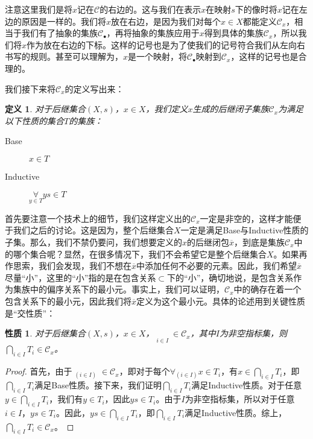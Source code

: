 \documentclass[oneside, 12pt]{ctexart}
\newtheorem{definition}{定义}[section]
\newtheorem{property}{性质}[section]
\begin{document}
注意这里我们是将$x$记在$\mathcal{C}$的右边的。这与我们在表示$x$在映射$s$下的像时将$x$记在左边的原因是一样的。我们将$x$放在右边，是因为我们对每个$x \in X$都能定义$\mathcal{C}_x$，相当于我们有了抽象的集族$\mathcal{C}_{\bullet}$，再将抽象的集族应用于$x$得到具体的集族$\mathcal{C}_x$，所以我们将$x$作为放在右边的下标。这样的记号也是为了使我们的记号符合我们从左向右书写的规则。甚至可以理解为，$x$是一个映射，将$\mathcal{C}_\bullet$映射到$\mathcal{C}_x$，这样的记号也是合理的。

我们接下来将$\mathcal{C}_x$的定义写出来：

\begin{definition}
	对于后继集合$(X, s)$，$x \in X$，我们定义$x$生成的后继闭子集族$\mathcal{C}_x$为满足以下性质的集合$T$的集族：
	\begin{description}
		\item[Base] $x \in T$
		\item[Inductive] $\mathop{\forall}\limits_{y \in T} ys \in T$
	\end{description}
\end{definition}

首先要注意一个技术上的细节，我们这样定义出的$\mathcal{C}_x$一定是非空的，这样才能便于我们之后的讨论。这是因为，整个后继集合$X$一定是满足Base与Inductive性质的子集。那么，我们不禁仍要问，我们想要定义的$x$的后继闭包$\overline{x}$，到底是集族$\mathcal{C}_x$中的哪个集合呢？显然，在很多情况下，我们不会希望它是整个后继集合$X$。如果再作思索，我们会发现，我们不想在$\overline{x}$中添加任何不必要的元素。因此，我们希望$\overline{x}$尽量“小”，这里的“小”指的是在包含关系$\subset$下的“小”，确切地说，是包含关系作为集族中的偏序关系下的最小元。事实上，我们可以证明，$\mathcal{C}_x$中的确存在着一个包含关系下的最小元，因此我们将$\overline{x}$定义为这个最小元。具体的论述用到关键性质是“交性质”：

\begin{property}
	对于后继集合$(X, s)$，$x \in X$，$\mathop{T_i}\limits_{i \in I} \in \mathcal{C}_x$，其中$I$为非空指标集，则$\bigcap\limits_{i \in I} T_i \in \mathcal{C}_x$。
\end{property}

\begin{proof}
	首先，由于$\mathop{T_i}_{(i \in I)} \in \mathcal{C}_x$，即对于每个$\mathop{\forall}_{(i \in I)}x \in T_i$，有$x \in \bigcap_{i \in I} T_i$，即$\bigcap_{i \in I} T_i$满足Base性质。接下来，我们证明$\bigcap_{i \in I} T_i$满足Inductive性质。对于任意$y \in \bigcap_{i \in I} T_i$，我们有$y \in T_i$，因此$ys \in T_i$。由于$I$为非空指标集，所以对于任意$i \in I$，$ys \in T_i$。因此，$ys \in \bigcap_{i \in I} T_i$，即$\bigcap_{i \in I} T_i$满足Inductive性质。综上，$\bigcap_{i \in I} T_i \in \mathcal{C}_x$。
\end{proof}
\end{document}
